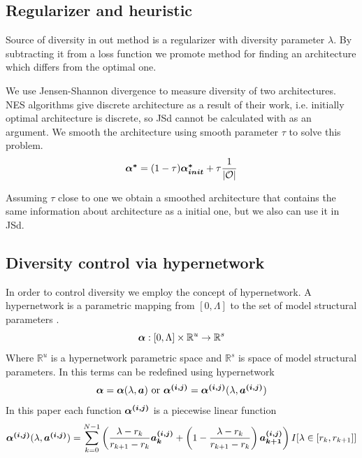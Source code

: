 \documentclass{article}
\begin{document}
\subsection{Regularizer and heuristic}

Source of diversity in out method is a regularizer with diversity parameter $\lambda$. By subtracting it from a loss function we promote method for finding an architecture which differs from the optimal one.

We use Jensen-Shannon divergence to measure diversity of two architectures. NES algorithms give discrete architecture as a result of their work, i.e. initially optimal architecture \mbox{} is discrete, so JSd cannot be calculated with \mbox{} as an argument. We smooth the architecture using smooth parameter $\tau$ to solve this problem. 
$$
\mbox{\boldmath{$\alpha^*$}} = (1 - \tau)\mbox{\boldmath{$\alpha_{init}^*$}} + \tau \frac{1}{|\mathcal{O}|}
$$

Assuming $\tau$ close to one we obtain a smoothed architecture that contains the same information about architecture as a initial one, but we also can use it in JSd.

\subsection{Diversity control via hypernetwork}

In order to control diversity we employ the concept of hypernetwork. A hypernetwork is a parametric mapping from $[0, \Lambda]$ to the set of model structural parameters \citep{darts-cc}.
$$
\mbox{\boldmath{$\alpha$}} : [0, \Lambda] \times \mathbb{R}^u \to \mathbb{R}^s
$$
Where $\mathbb{R}^u$ is a hypernetwork parametric space and $\mathbb{R}^s$ is space of model structural parameters. In this terms \mbox{\boldmath{$\alpha$}} can be redefined using hypernetwork
$$
\mbox{\boldmath{$\alpha$}} = \mbox{\boldmath{$\alpha$}}(\lambda, \mbox{\boldmath{$a$}}) \text{ or } \mbox{\boldmath{$\alpha^{(i, j)}$}} = \mbox{\boldmath{$\alpha^{(i, j)}$}}(\lambda, \mbox{\boldmath{$a^{(i, j)}$}})
$$
In this paper each function $\mbox{\boldmath{$\alpha^{(i, j)}$}}$ is a piecewise linear function
$$
\mbox{\boldmath{$\alpha^{(i, j)}$}}(\lambda, \mbox{\boldmath{$a^{(i, j)}$}}) = \sum_{k=0}^{N-1} \left( \frac{\lambda - r_k}{r_{k + 1} - r_k} \mbox{\boldmath{$a_k^{(i, j)}$}} + \left(1 - \frac{\lambda - r_k}{r_{k + 1} - r_k}\right) \mbox{\boldmath{$a_{k + 1}^{(i, j)}$}} \right) I[\lambda \in [r_k, r_{k+1}]]
$$
\end{document}
